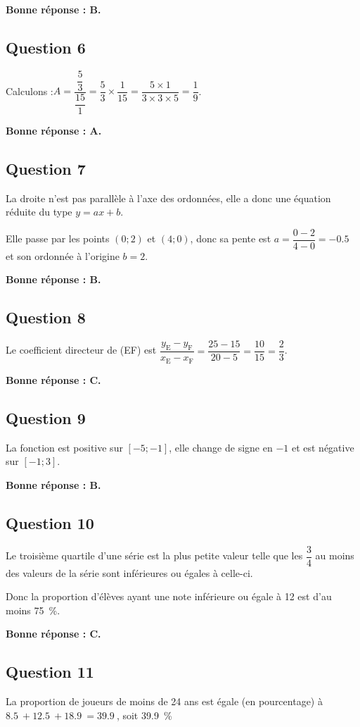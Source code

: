 \documentclass[10pt]{article}
\providecommand{\np}[2][]{{#2~#1}}
\begin{document}
	\textbf{Bonne réponse : B.}

\subsection*{Question 6}
	Calculons :\quad \mbox{$A = \dfrac{\dfrac53}{\dfrac{15}{1}} = \dfrac53\times\dfrac{1}{15} = \dfrac{5\times1}{3\times3\times5} = \dfrac19$}.

	\textbf{Bonne réponse : A.}

\subsection*{Question 7}
	La droite n'est pas parallèle à l'axe des ordonnées, elle a donc une équation réduite du type \mbox{$y = ax + b$}.

	Elle passe par les points \mbox{$(0;2)$} et \mbox{$(4;0)$}, donc sa pente est \mbox{$a = \dfrac{0-2}{4-0} = -\np{0.5}$} et son ordonnée à l'origine \mbox{$b = 2$}.

	\textbf{Bonne réponse : B.}

\subsection*{Question 8}
	Le coefficient directeur de (EF) est \mbox{$\dfrac{y_\text{E}-y_\text{F}}{x_\text{E}-x_\text{F}} = \dfrac{25-15}{20-5} = \dfrac{10}{15} = \dfrac23$}.

	\textbf{Bonne réponse : C.}

\subsection*{Question 9}
	La fonction est positive sur \mbox{$[-5;-1]$}, elle change de signe en $-1$ et est négative sur \mbox{$[-1;3]$}.

	\textbf{Bonne réponse : B.}

\subsection*{Question 10}
	Le troisième quartile d'une série est la plus petite valeur telle que les \mbox{$\dfrac34$} au moins des valeurs de la série sont inférieures ou égales à celle-ci.

	Donc la proportion d'élèves ayant une note inférieure ou égale à 12 est d'au moins 75~\%.

	\textbf{Bonne réponse : C.}

\subsection*{Question 11}
	La proportion de joueurs de moins de 24 ans est égale (en pourcentage) à \mbox{$\np{8.5}+\np{12.5}+\np{18.9} = \np{39.9}$}, soit \np[\%]{39.9}
\end{document}
